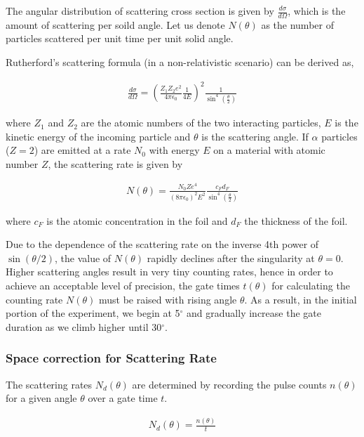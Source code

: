 The angular distribution of scattering cross section is given by $\frac{d\sigma}{d\Omega}$, which is the amount of scattering per soild angle. Let us denote $N(\theta)$ as the number of particles scattered per unit time per unit solid angle.

Rutherford's scattering formula (in a non-relativistic scenario) can be derived as,

\begin{align}
    \frac{d\sigma}{d\Omega} = \left(\frac{Z_1 Z_2e^2}{4\pi\epsilon_0} \frac{1}{4E}\right)^2 \frac{1}{\sin^4(\frac{\theta}{2})}
\end{align}

where $Z_1$ and $Z_2$ are the atomic numbers of the two interacting particles, $E$ is the kinetic energy of the incoming particle and $\theta$ is the scattering angle. If $\alpha$ particles ($Z=2$) are emitted at a rate $N_0$ with energy $E$ on a material with atomic number $Z$, the scattering rate is given by

\begin{align} \label{eq:2}
    N(\theta) = \frac{N_0Ze^4}{(8\pi\epsilon_0)^2 E^2} \frac{c_F d_F}{\sin^4(\frac{\theta}{2})}
\end{align}

where $c_F$ is the atomic concentration in the foil and $d_F$
the thickness of the foil.

Due to the dependence of the scattering rate on the inverse 4th power of $\sin(\theta/2)$, the value of $N(\theta)$ rapidly declines after the singularity at $\theta=0$. 
Higher scattering angles result in very tiny counting rates, hence in order to achieve an acceptable level of precision, the gate times $t(\theta)$ for calculating the counting rate $N (\theta)$ must be raised with rising angle $\theta$. As a result, in the initial portion of the experiment, we begin at 5$^\circ$ and gradually increase the gate duration as we climb higher until 30$^\circ$.

\subsubsection*{Space correction for Scattering Rate}
The scattering rates $N_d(\theta)$ are determined by recording the pulse counts $n(\theta)$ for a given angle $\theta$ over a gate time $t$.

\begin{align}
    N_d(\theta) = \frac{n(\theta)}{t}
\end{align}

